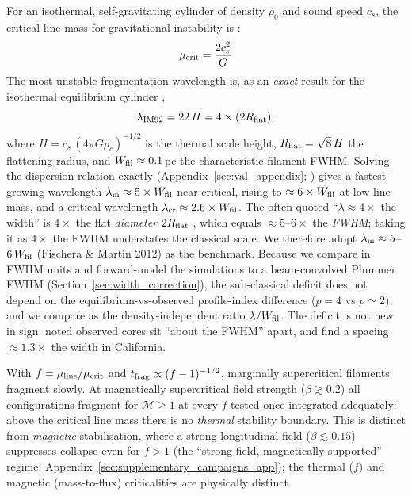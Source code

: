 \documentclass[usenatbib,twoside,twocolumn]{mnras}
\begin{document}
For an isothermal, self-gravitating cylinder of density $\rho_0$ and sound speed $c_s$, the critical line mass for gravitational instability is \citep{Ostriker1964}:
\begin{equation}
\mu_{\rm crit} = \frac{2c_s^2}{G}
\end{equation}
The most unstable fragmentation wavelength is, as an \emph{exact} result for the isothermal equilibrium cylinder \citep{Inutsuka1992},
\begin{equation}
\lambda_{\rm IM92} = 22\,H = 4\times(2R_{\rm flat}),
\label{eq:im92}
\end{equation}
where $H = c_s\,(4\pi G\rho_c)^{-1/2}$ is the thermal scale height, $R_{\rm flat}=\sqrt8\,H$ the flattening radius, and $W_{\rm fil}\approx0.1$\,pc the characteristic filament FWHM. Solving the dispersion relation exactly (Appendix~\ref{sec:val_appendix}; \citealt{Fischera2012}) gives a fastest-growing wavelength $\lambda_{\rm m}\approx5\times W_{\rm fil}$ near-critical, rising to $\approx6\times W_{\rm fil}$ at low line mass, and a critical wavelength $\lambda_{\rm cr}\approx2.6\times W_{\rm fil}$. The often-quoted ``$\lambda\approx4\times$ the width'' is $4\times$ the flat \emph{diameter} $2R_{\rm flat}$ \citep{Inutsuka1992}, which equals $\approx5$--$6\times$ the \emph{FWHM}; taking it as $4\times$ the FWHM understates the classical scale. We therefore adopt $\lambda_{\rm m}\approx5$--$6\,W_{\rm fil}$ (Fischera \& Martin 2012) as the benchmark. Because we compare in FWHM units and forward-model the simulations to a beam-convolved Plummer FWHM (Section~\ref{sec:width_correction}), the sub-classical deficit does not depend on the equilibrium-vs-observed profile-index difference ($p=4$ vs $p\simeq2$), and we compare as the density-independent ratio $\lambda/W_{\rm fil}$. The deficit is not new in sign: \citet{Fischera2012} noted observed cores sit ``about the FWHM'' apart, and \citet{Zhang2023cal} find a spacing $\approx1.3\times$ the width in California.

With $f=\mu_{\rm line}/\mu_{\rm crit}$ and $t_{\rm frag}\propto(f-1)^{-1/2}$, marginally supercritical filaments fragment slowly. At magnetically supercritical field strength ($\beta\gtrsim0.2$) all configurations fragment for $\mathcal{M}\geq1$ at every $f$ tested once integrated adequately: above the critical line mass there is no \emph{thermal} stability boundary. This is distinct from \emph{magnetic} stabilisation, where a strong longitudinal field ($\beta\lesssim0.15$) suppresses collapse even for $f>1$ (the ``strong-field, magnetically supported'' regime; Appendix~\ref{sec:supplementary_campaigns_app}); the thermal ($f$) and magnetic (mass-to-flux) criticalities are physically distinct.
\end{document}
